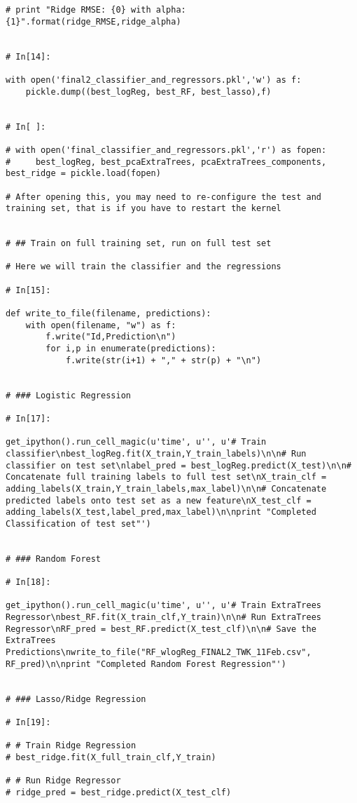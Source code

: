 \documentclass[11pt, oneside]{article}   	%
\begin{document}
\begin{lstlisting}
# print "Ridge RMSE: {0} with alpha: {1}".format(ridge_RMSE,ridge_alpha)


# In[14]:

with open('final2_classifier_and_regressors.pkl','w') as f:
    pickle.dump((best_logReg, best_RF, best_lasso),f)


# In[ ]:

# with open('final_classifier_and_regressors.pkl','r') as fopen:
#     best_logReg, best_pcaExtraTrees, pcaExtraTrees_components, best_ridge = pickle.load(fopen)
    
# After opening this, you may need to re-configure the test and training set, that is if you have to restart the kernel


# ## Train on full training set, run on full test set

# Here we will train the classifier and the regressions

# In[15]:

def write_to_file(filename, predictions):
    with open(filename, "w") as f:
        f.write("Id,Prediction\n")
        for i,p in enumerate(predictions):
            f.write(str(i+1) + "," + str(p) + "\n")


# ### Logistic Regression

# In[17]:

get_ipython().run_cell_magic(u'time', u'', u'# Train classifier\nbest_logReg.fit(X_train,Y_train_labels)\n\n# Run classifier on test set\nlabel_pred = best_logReg.predict(X_test)\n\n# Concatenate full training labels to full test set\nX_train_clf = adding_labels(X_train,Y_train_labels,max_label)\n\n# Concatenate predicted labels onto test set as a new feature\nX_test_clf = adding_labels(X_test,label_pred,max_label)\n\nprint "Completed Classification of test set"')


# ### Random Forest

# In[18]:

get_ipython().run_cell_magic(u'time', u'', u'# Train ExtraTrees Regressor\nbest_RF.fit(X_train_clf,Y_train)\n\n# Run ExtraTrees Regressor\nRF_pred = best_RF.predict(X_test_clf)\n\n# Save the ExtraTrees Predictions\nwrite_to_file("RF_wlogReg_FINAL2_TWK_11Feb.csv", RF_pred)\n\nprint "Completed Random Forest Regression"')


# ### Lasso/Ridge Regression

# In[19]:

# # Train Ridge Regression
# best_ridge.fit(X_full_train_clf,Y_train)

# # Run Ridge Regressor
# ridge_pred = best_ridge.predict(X_test_clf)


\end{lstlisting}
\end{document}
